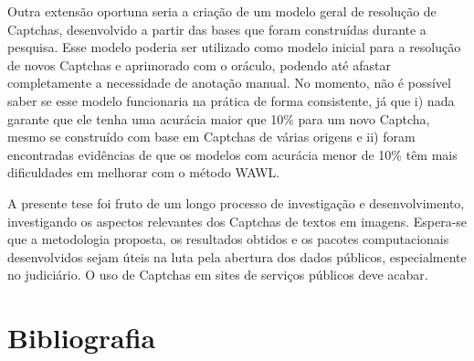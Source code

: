 \documentclass[12pt,twoside,brazilian]{book}
\begin{document}
Outra extensão oportuna seria a criação de um modelo geral de resolução
de Captchas, desenvolvido a partir das bases que foram construídas
durante a pesquisa. Esse modelo poderia ser utilizado como modelo
inicial para a resolução de novos Captchas e aprimorado com o oráculo,
podendo até afastar completamente a necessidade de anotação manual. No
momento, não é possível saber se esse modelo funcionaria na prática de
forma consistente, já que i) nada garante que ele tenha uma acurácia
maior que 10\% para um novo Captcha, mesmo se construído com base em
Captchas de várias origens e ii) foram encontradas evidências de que os
modelos com acurácia menor de 10\% têm mais dificuldades em melhorar com
o método WAWL.

A presente tese foi fruto de um longo processo de investigação e
desenvolvimento, investigando os aspectos relevantes dos Captchas de
textos em imagens. Espera-se que a metodologia proposta, os resultados
obtidos e os pacotes computacionais desenvolvidos sejam úteis na luta
pela abertura dos dados públicos, especialmente no judiciário. O uso de
Captchas em sites de serviços públicos deve acabar.


\hypertarget{bibliografia}{%
\chapter*{Bibliografia}\label{bibliografia}}

\end{document}
